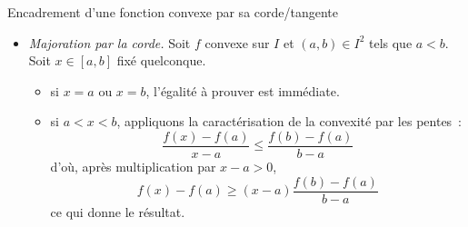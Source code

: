 \documentclass{article}
\renewenvironment{question_kholle}[2][ ]
{
	\subsection{\texorpdfstring{#2}{}}
	\notblank{#1}
	{
		\noindent #1
		\bigbreak
	}
	{}
	\begin{proof}
}
{
	\end{proof}
}
\begin{document}
{Encadrement d’une fonction convexe par sa corde/tangente}
	\begin{itemize}[label=$\vartriangleright$]
		\item \textit{Majoration par la corde.} Soit $f$ convexe sur $I$ et $(a,b)\in I^{2}$ tels que $a<b$. Soit $x\in [a,b]$ fixé quelconque.
		      \begin{itemize}
			      \item si $x=a$ ou $x=b$, l’égalité à prouver est immédiate.
			      \item si $a<x<b$, appliquons la caractérisation de la convexité par les pentes~:
			            \[
				            \frac{f(x)-f(a)}{x-a} \leq \frac{f(b)-f(a)}{b-a}
			            \]
			            d’où, après multiplication par $x-a>0$,
			            \[
				            f(x)-f(a) \geq (x-a)\frac{f(b)-f(a)}{b-a}
			            \]
			            ce qui donne le résultat.
		      \end{itemize}


\end{itemize}
\end{question_kholle}
\end{document}
